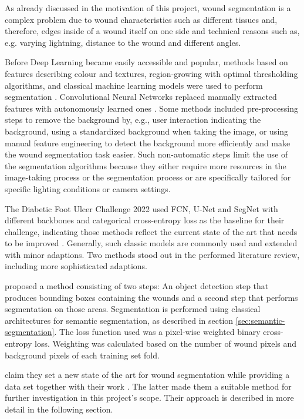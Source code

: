 As already discussed in the motivation of this project, wound segmentation is a complex problem due to wound characteristics such as different tissues and, therefore, edges inside of a wound itself on one side and technical reasons such as, e.g. varying lightning, distance to the wound and different angles. 

Before Deep Learning became easily accessible and popular, methods based on features describing colour and textures, region-growing with optimal thresholding algorithms, and classical machine learning models were used to perform segmentation \cite{Scebba2022}. Convolutional Neural Networks replaced manually extracted features with autonomously learned ones \cite{Scebba2022}. Some methods included pre-processing steps to remove the background by, e.g., user interaction indicating the background, using a standardized background when taking the image, or using manual feature engineering to detect the background more efficiently and make the wound segmentation task easier. Such non-automatic steps limit the use of the segmentation algorithms because they either require more resources in the image-taking process or the segmentation process or are specifically tailored for specific lighting conditions or camera settings.

The Diabetic Foot Ulcer Challenge 2022 used FCN, U-Net and SegNet with different backbones and categorical cross-entropy loss as the baseline for their challenge, indicating those methods reflect the current state of the art that needs to be improved \cite{DFUC2022}. Generally, such classic models are commonly used and extended with minor adaptions. Two methods stood out in the performed literature review, including more sophisticated adaptions.

\citeauthor{Scebba2022} proposed a method consisting of two steps: An object detection step that produces bounding boxes containing the wounds and a second step that performs segmentation on those areas. Segmentation is performed using classical architectures for semantic segmentation, as described in section \ref{sec:semantic-segmentation}. The loss function used was a pixel-wise weighted binary cross-entropy loss. Weighting was calculated based on the number of wound pixels and background pixels of each training set fold.

\citeauthor{Oota_2023_WACV} claim they set a new state of the art for wound segmentation while providing a data set together with their work \cite{Oota_2023_WACV}. The latter made them a suitable method for further investigation in this project's scope. Their approach is described in more detail in the following section.

